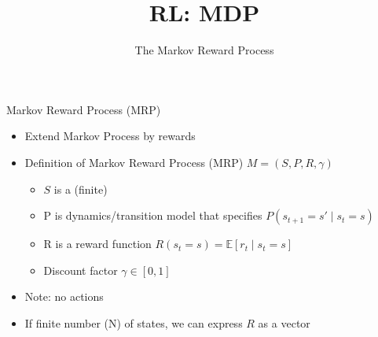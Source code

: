 


\title[Reinforcement Learning: Big Picture]{RL: MDP}
\subtitle{The Markov Reward Process}




	
	\maketitle

\begin{frame}[c]{Markov Reward Process (MRP)}

\begin{itemize}
	\item Extend Markov Process by rewards
	\item Definition of Markov Reward Process (MRP) $M =(S, P, R, \gamma)$
	\begin{itemize}
		\item $S$ is a (finite)
		\item P is dynamics/transition model that specifies $P(s_{t+1}=s' \mid s_t = s)$
		\item R is a reward function $R(s_t = s) = \mathbb{E}[r_t \mid s_t = s]$
		\item Discount factor $\gamma \in [0,1]$
	\end{itemize}
	\item Note: no actions
	\item If finite number (N) of states, we can express $R$ as a vector
\end{itemize}

\end{frame}


